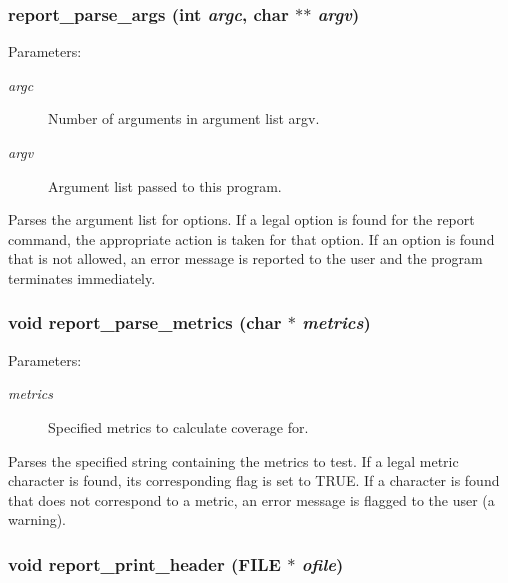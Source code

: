 \subsubsection{ report\_\-parse\_\-args (int {\em argc}, char $\ast$$\ast$ {\em argv})}\label{report_8c_a11}


\begin{Desc}
\item[Parameters: ]\par
\begin{description}
\item[{\em 
argc}]Number of arguments in argument list argv. \item[{\em 
argv}]Argument list passed to this program.\end{description}
\end{Desc}
Parses the argument list for options. If a legal option is found for the report command, the appropriate action is taken for that option. If an option is found that is not allowed, an error message is reported to the user and the program terminates immediately. 
\subsubsection{\setlength{\rightskip}{0pt plus 5cm}void report\_\-parse\_\-metrics (char $\ast$ {\em metrics})}\label{report_8c_a10}


\begin{Desc}
\item[Parameters: ]\par
\begin{description}
\item[{\em 
metrics}]Specified metrics to calculate coverage for.\end{description}
\end{Desc}
Parses the specified string containing the metrics to test. If a legal metric character is found, its corresponding flag is set to TRUE. If a character is found that does not correspond to a metric, an error message is flagged to the user (a warning). 
\subsubsection{\setlength{\rightskip}{0pt plus 5cm}void report\_\-print\_\-header (FILE $\ast$ {\em ofile})}\label{report_8c_a13}


